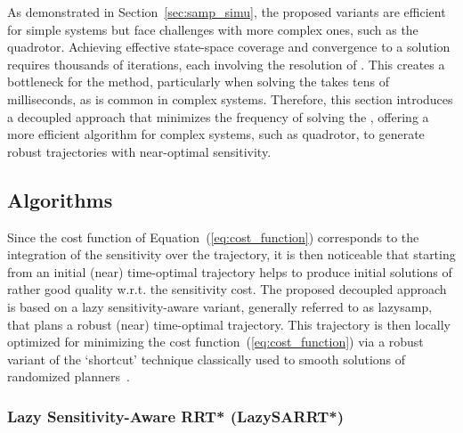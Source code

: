 As demonstrated in Section~\ref{sec:samp_simu}, the proposed  variants are efficient for simple systems but face challenges with more complex ones, such as the quadrotor. 
Achieving effective state-space coverage and convergence to a solution requires thousands of iterations, each involving the resolution of . 
This creates a bottleneck for the method, particularly when solving the  takes tens of milliseconds, as is common in complex systems.
Therefore, this section introduces a decoupled approach that minimizes the frequency of solving the , offering a more efficient algorithm for complex systems, such as quadrotor, to generate robust trajectories with near-optimal sensitivity.

\subsection{Algorithms}

Since the cost function of Equation~(\ref{eq:cost_function}) corresponds to the integration of the sensitivity over the trajectory, it is then noticeable that starting from an initial (near) time-optimal trajectory helps to produce initial solutions of rather good quality w.r.t. the sensitivity cost.
The proposed decoupled approach is based on a lazy sensitivity-aware variant, generally referred to as \gls{lazysamp}, that plans a robust (near) time-optimal trajectory.
This trajectory is then locally optimized for minimizing the cost function~(\ref{eq:cost_function}) via a robust variant of the `shortcut' technique classically used to smooth solutions of randomized planners~\cite{cShortcut}. 

\subsubsection{Lazy Sensitivity-Aware RRT* (LazySARRT*)}\label{sec:lazy_rrt*}

